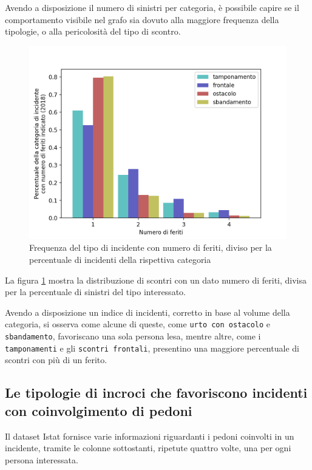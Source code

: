 \documentclass[a4paper,12pt]{report}
\newcommand{\columnstyle}[1]{\texttt{#1}}
\begin{document}
Avendo a disposizione il numero di sinistri per categoria, è possibile capire 
se il comportamento visibile nel grafo sia dovuto alla maggiore frequenza della tipologie, 
o alla pericolosità del tipo di scontro. 

\begin{figure}
    \includegraphics[width=\linewidth]{../src/incidenti/incidenti_senza_coords/natura_incidente/perc_natura_incidente.png}
    \caption{Frequenza del tipo di incidente con numero di feriti, diviso per la percentuale di incidenti della rispettiva categoria}
    \label{fig:perc-numero-feriti}
\end{figure}

La figura \ref{fig:perc-numero-feriti} mostra la distribuzione di scontri con un dato numero 
di feriti, divisa per la percentuale di sinistri del tipo interessato. 

Avendo a disposizione un indice di incidenti, corretto in base al volume della categoria, 
si osserva come alcune di queste, come \columnstyle{urto con ostacolo} 
e \columnstyle{sbandamento}, favoriscano una sola persona lesa, mentre altre, 
come i \columnstyle{tamponamenti} e gli \columnstyle{scontri frontali}, presentino 
una maggiore percentuale di scontri con più di un ferito. 

\subsection{Le tipologie di incroci che favoriscono incidenti con coinvolgimento di pedoni}

Il dataset Istat fornisce varie informazioni riguardanti i pedoni coinvolti in un 
incidente, tramite le colonne sottostanti, ripetute quattro volte, 
una per ogni persona interessata.
\end{document}
